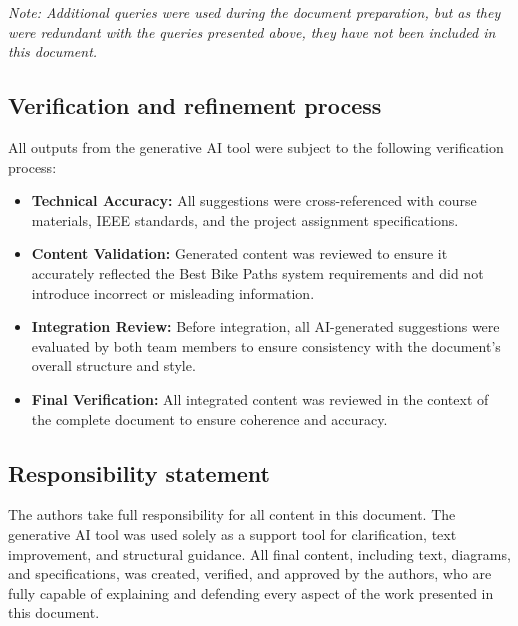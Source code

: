 \textit{Note: Additional queries were used during the document preparation, but as they were redundant with the queries presented above, they have not been included in this document.}

\subsection*{Verification and refinement process}

All outputs from the generative AI tool were subject to the following verification process:
\begin{itemize}
    \item \textbf{Technical Accuracy:} All suggestions were cross-referenced with course materials, IEEE standards, and the project assignment specifications.
    \item \textbf{Content Validation:} Generated content was reviewed to ensure it accurately reflected the Best Bike Paths system requirements and did not introduce incorrect or misleading information.
    \item \textbf{Integration Review:} Before integration, all AI-generated suggestions were evaluated by both team members to ensure consistency with the document's overall structure and style.
    \item \textbf{Final Verification:} All integrated content was reviewed in the context of the complete document to ensure coherence and accuracy.
\end{itemize}

\subsection*{Responsibility statement}
The authors take full responsibility for all content in this document. The generative AI tool was used solely as a support tool for clarification, text improvement, and structural guidance. All final content, including text, diagrams, and specifications, was created, verified, and approved by the authors, who are fully capable of explaining and defending every aspect of the work presented in this document.